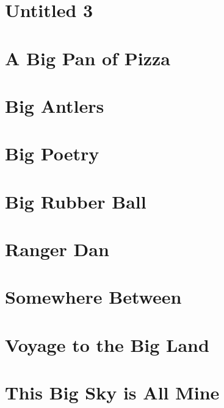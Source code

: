 \documentclass[oneside,14pt]{memoir} %
\newcommand{\chaptereightvar}{poem/pink_panties.tex}
\newcommand{\chapterninevar}{poem/untitled_3.tex}
\newcommand{\chapterXvar}{poem/a_big_pan_of_pizza.tex}
\newcommand{\chapterXIvar}{poem/big_antlers.tex}
\newcommand{\chapterXIIvar}{poem/big_poetry.tex}
\newcommand{\chapterXIIIvar}{poem/big_rubber_ball.tex}
\newcommand{\chapterXIVvar}{poem/ranger_dan.tex}
\newcommand{\chapterXVvar}{poem/somewhere_between.tex}
\newcommand{\chapterXVIvar}{poem/voyage_to_the_big_land.tex}
\begin{document}


\chapter{Untitled 3}



\chapter{A Big Pan of Pizza}



\chapter{Big Antlers}



\chapter{Big Poetry}



\chapter{Big Rubber Ball}



\chapter{Ranger Dan}



\chapter{Somewhere Between}



\chapter{Voyage to the Big Land}



\chapter{This Big Sky is All Mine}
\end{document}
